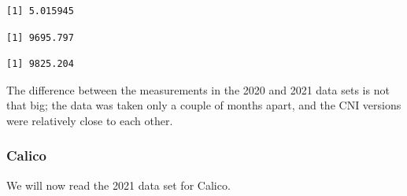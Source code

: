 \begin{Shaded}
\begin{Highlighting}[]
\SpecialCharTok{\$}
\end{Highlighting}
\end{Shaded}

\begin{verbatim}
[1] 5.015945
\end{verbatim}

\begin{Shaded}
\begin{Highlighting}[]
\SpecialCharTok{\$}
\end{Highlighting}
\end{Shaded}

\begin{verbatim}
[1] 9695.797
\end{verbatim}

\begin{Shaded}
\begin{Highlighting}[]
\SpecialCharTok{\$}
\end{Highlighting}
\end{Shaded}

\begin{verbatim}
[1] 9825.204
\end{verbatim}

The difference between the measurements in the 2020 and 2021 data sets is not that big; the data was taken only a couple of months apart, and the CNI versions were relatively close to each other.

\subsubsection{Calico}

We will now read the 2021 data set for Calico.

\begin{Shaded}
\begin{Highlighting}[]
\OtherTok{\textless{}{-}} 
\OtherTok{\textless{}{-}} \NormalTok{(}\NormalTok{,}\NormalTok{))}
\end{Highlighting}
\end{Shaded}

